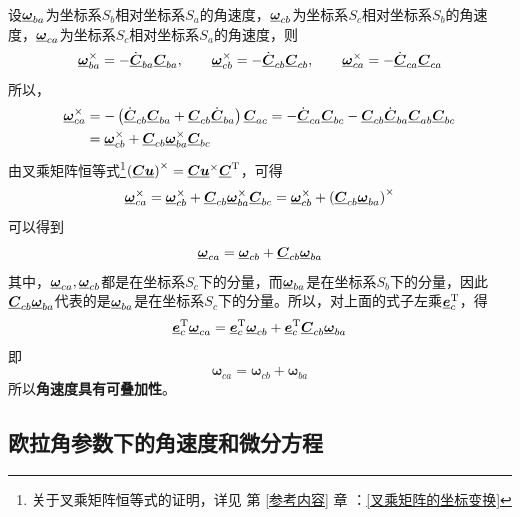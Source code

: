 设$\underline{\bm{\omega}}_{ba}$为坐标系$S_b$相对坐标系$S_a$的角速度，$\underline{\bm{\omega}}_{cb}$为坐标系$S_c$相对坐标系$S_b$的角速度，$\underline{\bm{\omega}}_{ca}$为坐标系$S_c$相对坐标系$S_a$的角速度，则
\begin{equation}
	\underline{\bm{\omega}}_{ba}^\times = - \dot{\underline{\bm{C}}}_{ba} \underline{\bm{C}}_{ba}, \qquad 
	\underline{\bm{\omega}}_{cb}^\times = - \dot{\underline{\bm{C}}}_{cb} \underline{\bm{C}}_{cb}, \qquad 
	\underline{\bm{\omega}}_{ca}^\times = - \dot{\underline{\bm{C}}}_{ca} \underline{\bm{C}}_{ca}
\end{equation}
所以，
\begin{align*}
	\underline{\bm{\omega}}_{ca}^\times &= -\left(\dot{\underline{\bm{C}}}_{cb} \underline{\bm{C}}_{ba} + \underline{\bm{C}}_{cb}\dot{\underline{\bm{C}}}_{ba}\right)\underline{\bm{C}}_{ac} 
	= -\dot{\underline{\bm{C}}}_{ca} \underline{\bm{C}}_{bc} - \underline{\bm{C}}_{cb} \dot{\underline{\bm{C}}}_{ba} \underline{\bm{C}}_{ab} \underline{\bm{C}}_{bc} \\
	&= \underline{\bm{\omega}}_{cb}^\times + \underline{\bm{C}}_{cb} \underline{\bm{\omega}}_{ba}^\times \underline{\bm{C}}_{bc}
\end{align*}
由叉乘矩阵恒等式\footnote[1]{关于叉乘矩阵恒等式的证明，详见 第 \ref{参考内容} 章 ：\ref{叉乘矩阵的坐标变换}  \link[叉乘矩阵的坐标变换]}$\left( \underline{\bm{C}} \underline{\bm{u}} \right)^\times = \underline{\bm{C}} \underline{\bm{u}}^\times \underline{\bm{C}}^{\text{T}}$，可得
\begin{equation*}
	\underline{\bm{\omega}}_{ca}^\times = \underline{\bm{\omega}}_{cb}^\times + \underline{\bm{C}}_{cb} \underline{\bm{\omega}}_{ba}^\times \underline{\bm{C}}_{bc} = \underline{\bm{\omega}}_{cb}^\times + \left( \underline{\bm{C}}_{cb} \underline{\bm{\omega}}_{ba} \right)^\times
\end{equation*}
可以得到
\begin{equation}
	\underline{\bm{\omega}}_{ca} = \underline{\bm{\omega}}_{cb} + \underline{\bm{C}}_{cb}\underline{\bm{\omega}}_{ba}
\end{equation}
其中，$\underline{\bm{\omega}}_{ca}, \underline{\bm{\omega}}_{cb}$都是在坐标系$S_c$下的分量，而$\underline{\bm{\omega}}_{ba}$是在坐标系$S_b$下的分量，因此$\underline{\bm{C}}_{cb}\underline{\bm{\omega}}_{ba}$代表的是$\underline{\bm{\omega}}_{ba}$是在坐标系$S_c$下的分量。所以，对上面的式子左乘$\underline{\bm{e}}_c^{\text{T}}$，得
\begin{equation*}
	\underline{\bm{e}}_c^{\text{T}} \underline{\bm{\omega}}_{ca} = \underline{\bm{e}}_c^{\text{T}} \underline{\bm{\omega}}_{cb} + \underline{\bm{e}}_c^{\text{T}} \underline{\bm{C}}_{cb}\underline{\bm{\omega}}_{ba}
\end{equation*}
即
\begin{equation}
	\bm{\omega}_{ca} = \bm{\omega}_{cb} + \bm{\omega}_{ba}
\end{equation}
所以\textbf{角速度具有可叠加性}。



\subsection{欧拉角参数下的角速度和微分方程}

